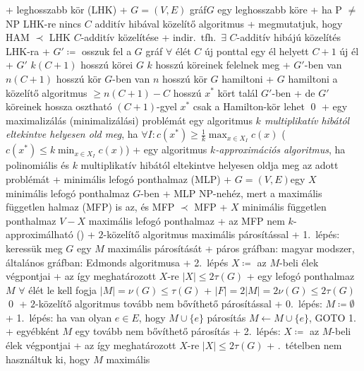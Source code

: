 + \prob leghosszabb kör (LHK)
  + \DataIn $G = (V, E)$ gráf\qquad\DataOut $G$ egy leghosszabb köre
  + \thm ha P $\ne$ NP \RA LHK-re nincs $C$ additív hibával
    közelítő algoritmus
    + \proof megmutatjuk, hogy HAM $\prec$ LHK $C$-additív közelítése
    + indir.~tfh.~$\exists$ $C$-additív hibájú közelítés LHK-ra
    + $G' \coloneqq$ osszuk fel a $G$ gráf $\forall$ élét $C$ új
      ponttal \RA egy él helyett $C + 1$ új él
    + $G'$ $k (C + 1)$ hosszú körei $G$ $k$ hosszú köreinek felelnek meg
    + $G'$-ben van $n (C + 1)$ hosszú kör \LRA $G$-ben van $n$ hosszú
      kör \LRA $G$ hamiltoni
    + $G$ hamiltoni \RA a közelítő algoritmus $\ge n (C + 1) - C$
      hosszú $x^*$ kört talál $G'$-ben
      + de $G'$ köreinek hossza osztható $(C + 1)$-gyel \RA $x^*$
        csak a Hamilton-kör lehet \qed
+ \dfn egy maximalizálás (minimalizálási) problémát egy algoritmus
  \emph{$k$ multiplikatív hibától eltekintve helyesen old meg}, ha
  $\forall I : c(x^*) \ge \frac{1}{k} \max_{x \in X_I} c(x)$
  ($c(x^*) \le k \min_{x \in X_I} c(x)$)
+ \dfn egy algoritmus \emph{$k$-approximációs algoritmus}, ha
  polinomiális és $k$ multiplikatív hibától eltekintve helyesen oldja
  meg az adott problémát
+ \prob minimális lefogó ponthalmaz (MLP)
  + \DataIn $G = (V, E)$\qquad\DataOut egy $X$ minimális lefogó ponthalmaz
    $G$-ben
  + MLP NP-nehéz, mert a maximális független halmaz (MFP) is az, és
    MFP $\prec$ MFP
    + $X$ minimális független ponthalmaz \LRA $V - X$ maximális lefogó
      ponthalmaz
    + az MFP nem $k$-approximálható (\noproof)
  + \alg $2$-közelítő algoritmus maximális párosítással
    + 1.~lépés: keressük meg $G$ egy $M$ maximális párosítását
      + páros gráfban: magyar modszer, általános gráfban: Edmonds
        algoritmusa
    + 2.~lépés $X \coloneqq$ az $M$-beli élek végpontjai
    + \thm \label{thm:kozelito:multi:lefogo1}az így meghatározott $X$-re $\lvert X \rvert \le 2 \tau(G)$
      + \proof egy lefogó ponthalmaz $M$ $\forall$ élét le kell fogja
        \RA $\lvert M \rvert = \nu(G) \le \tau(G)$
      + $\lvert F \rvert = 2 \lvert M \rvert = 2 \nu(G) \le 2 \tau(G)$
        \qed
  + \alg $2$-közelítő algoritmus tovább nem bővíthető párosítással
    + 0.~lépés: $M \coloneqq \emptyset$
    + 1.~lépés: ha van olyan $e \in E$, hogy $M \cup \{e\}$ párosítás
      \RA $M \gets M \cup \{e\}$, GOTO 1.
      + egyébként $M$ egy tovább nem bővíthető párosítás
    + 2.~lépés: $X \coloneqq$ az $M$-beli élek végpontjai
    + \thm az így meghatározott $X$-re $\lvert X \rvert \le 2 \tau(G)$
      + \proof {}.~tételben nem
        használtuk ki, hogy $M$ maximális
